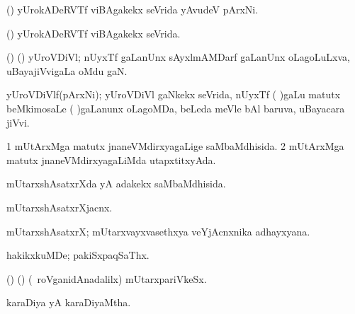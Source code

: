 {{\bentry
{} 
\gl{\nA}
\expl{}
\bmng
(\pArxvi) yUrokADeRVTf viBAgakekx seVrida yAvudeV pArxNi. 
\emng
\eentry

\bentry
{} 
\gl{\gu}
\expl{}
\bmng
(\pArxvi) yUrokADeRVTf viBAgakekx seVrida. 
\emng
\eentry

\bentry
{} 
\gl{\nA}
\expl{}
\bmng
(\bava) (\pArxvi) yUroVDiVl; nUyxTf gaLanUnx sAyxlmAMDarf  gaLanUnx oLagoLuLxva, uBayajiVvigaLa oMdu gaN. 
\emng
\eentry

\bentry
{} 
\gl{\nA}
\expl{}
\bmng
yUroVDiVlf(pArxNi); yUroVDiVl gaNkekx seVrida, nUyxTf ( )gaLu matutx beMkimosaLe ( )gaLanunx oLagoMDa, beLeda meVle bAl baruva, uBayacara jiVvi. 
\emng
\eentry

\bentry
{} 
\gl{\gu}
\expl{}
\bmng
\bnum
\num{1} mUtArxMga matutx jnaneVMdirxyagaLige saMbaMdhisida. 
\num{2} mUtArxMga matutx jnaneVMdirxyagaLiMda utapxtitxyAda. 
\enum
\emng
\eentry

\bentry
{} 
\gl{\gu}
\expl{}
\bmng
mUtarxshAsatxrXda yA adakekx saMbaMdhisida. 
\emng
\eentry

\bentry
{} 
\gl{\nA}
\expl{}
\bmng
mUtarxshAsatxrXjacnx. 
\emng
\eentry

\bentry
{} 
\gl{\nA}
\expl{}
\bmng
mUtarxshAsatxrX; mUtarxvayxvasethxya veYjAcnxnika adhayxyana. 
\emng
\eentry

\bentry
{} 
\gl{\nA}
\expl{}
\bmng
hakikxkuMDe; pakiSxpaqSaThx. 
\emng
\eentry

\bentry
{} 
\gl{\nA}
\expl{}
\bmng
(\veYshA) (\ca) (\kanmu\ roVganidAnadalilx) mUtarxpariVkeSx. 
\emng
\eentry

\bentry
{}
\gl{\nA}
\expl{}
\bmng
{} 
\emng
\eentry

\bentry
{}
\gl{\nA}
\expl{}
\bmng
{} 
\emng
\eentry

\bentry 
{} 
\gl{\gu}
\bmng
karaDiya yA karaDiyaMtha. 
\emng
\eentry

}}
